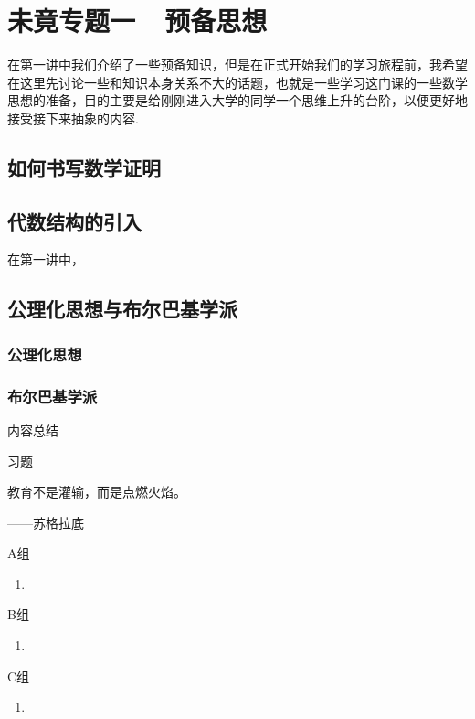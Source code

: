 \chapter*{未竟专题一\  \ 预备思想}

在第一讲中我们介绍了一些预备知识，但是在正式开始我们的学习旅程前，我希望在这里先讨论一些和知识本身关系不大的话题，也就是一些学习这门课的一些数学思想的准备，目的主要是给刚刚进入大学的同学一个思维上升的台阶，以便更好地接受接下来抽象的内容.

\section*{如何书写数学证明}

\section*{代数结构的引入}

在第一讲中，

\section*{公理化思想与布尔巴基学派}

\subsection*{公理化思想}

\subsection*{布尔巴基学派}

\vspace{2ex}
\centerline{\heiti \Large 内容总结}


\vspace{2ex}
\centerline{\heiti \Large 习题}

\vspace{2ex}
{\kaishu 教育不是灌输，而是点燃火焰。}
\begin{flushright}
    \kaishu
    ——苏格拉底
\end{flushright}

\centerline{\heiti A组}
\begin{enumerate}
    \item
\end{enumerate}

\centerline{\heiti B组}
\begin{enumerate}
    \item
\end{enumerate}

\centerline{\heiti C组}
\begin{enumerate}
    \item
\end{enumerate}

